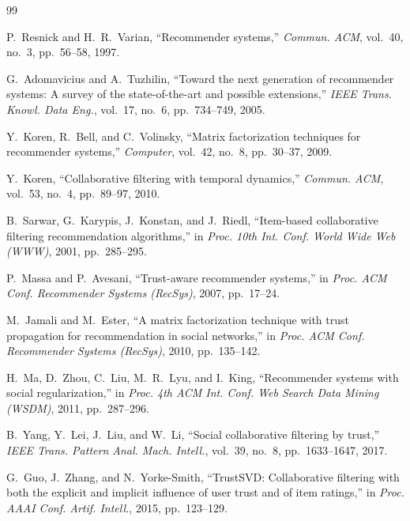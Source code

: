 \documentclass[conference]{IEEEtran}
\begin{document}
\begin{thebibliography}{99}

P.~Resnick and H.~R.~Varian,
``Recommender systems,''
\emph{Commun. ACM}, vol.~40, no.~3, pp.~56--58, 1997.

G.~Adomavicius and A.~Tuzhilin,
``Toward the next generation of recommender systems: A survey of the
state-of-the-art and possible extensions,''
\emph{IEEE Trans. Knowl. Data Eng.}, vol.~17, no.~6, pp.~734--749,
2005.

Y.~Koren, R.~Bell, and C.~Volinsky,
``Matrix factorization techniques for recommender systems,''
\emph{Computer}, vol.~42, no.~8, pp.~30--37, 2009.

Y.~Koren,
``Collaborative filtering with temporal dynamics,''
\emph{Commun. ACM}, vol.~53, no.~4, pp.~89--97, 2010.

B.~Sarwar, G.~Karypis, J.~Konstan, and J.~Riedl,
``Item-based collaborative filtering recommendation algorithms,''
in \emph{Proc. 10th Int. Conf. World Wide Web (WWW)}, 2001,
pp.~285--295.

P.~Massa and P.~Avesani,
``Trust-aware recommender systems,''
in \emph{Proc. ACM Conf. Recommender Systems (RecSys)}, 2007,
pp.~17--24.

M.~Jamali and M.~Ester,
``A matrix factorization technique with trust propagation for
recommendation in social networks,''
in \emph{Proc. ACM Conf. Recommender Systems (RecSys)}, 2010,
pp.~135--142.

H.~Ma, D.~Zhou, C.~Liu, M.~R.~Lyu, and I.~King,
``Recommender systems with social regularization,''
in \emph{Proc. 4th ACM Int. Conf. Web Search Data Mining (WSDM)}, 2011,
pp.~287--296.

B.~Yang, Y.~Lei, J.~Liu, and W.~Li,
``Social collaborative filtering by trust,''
\emph{IEEE Trans. Pattern Anal. Mach. Intell.}, vol.~39, no.~8,
pp.~1633--1647, 2017.

G.~Guo, J.~Zhang, and N.~Yorke-Smith,
``TrustSVD: Collaborative filtering with both the explicit and implicit
influence of user trust and of item ratings,''
in \emph{Proc. AAAI Conf. Artif. Intell.}, 2015, pp.~123--129.


\end{thebibliography}
\end{document}
